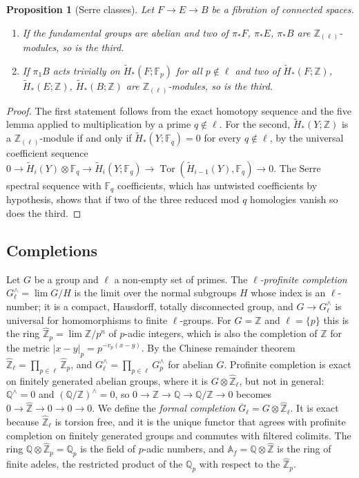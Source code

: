 \documentclass[11pt]{amsart}
\theoremstyle{plain}
\newtheorem{proposition}[theorem]{Proposition}
\theoremstyle{definition}
\numberwithin{equation}{section}
\newcommand{\Z}{\mathbb{Z}}
\newcommand{\Q}{\mathbb{Q}}
\newcommand{\F}{\mathbb{F}}
\newcommand{\Zhat}{\widehat{\mathbb{Z}}}
\newcommand{\Af}{\mathbb{A}_f}
\newcommand{\Zl}{\mathbb{Z}_{(\ell)}}
\DeclareMathOperator{\Tor}{Tor}
\begin{document}
\begin{proposition}[Serre classes]\label{prop:serre}
Let $F\to E\to B$ be a fibration of connected spaces.
\begin{enumerate}[label=\textup{(\arabic*)}]
\item If the fundamental groups are abelian and two of $\pi_*F$, $\pi_*E$, $\pi_*B$ are $\Zl$-modules, so is the third.
\item If $\pi_1B$ acts trivially on $\widetilde H_*(F;\F_p)$ for all $p\notin\ell$ and two of $\widetilde H_*(F;\Z)$, $\widetilde H_*(E;\Z)$, $\widetilde H_*(B;\Z)$ are $\Zl$-modules, so is the third.
\end{enumerate}
\end{proposition}

\begin{proof}
The first statement follows from the exact homotopy sequence and the five lemma applied to multiplication by a prime $q\notin\ell$.
For the second, $\widetilde H_*(Y;\Z)$ is a $\Zl$-module if and only if $\widetilde H_*(Y;\F_q)=0$ for every $q\notin\ell$, by the universal coefficient sequence $0\to\widetilde H_i(Y)\otimes\F_q\to\widetilde H_i(Y;\F_q)\to\Tor(\widetilde H_{i-1}(Y),\F_q)\to0$.
The Serre spectral sequence with $\F_q$ coefficients, which has untwisted coefficients by hypothesis, shows that if two of the three reduced mod $q$ homologies vanish so does the third.
\end{proof}

\subsection{Completions}
Let $G$ be a group and $\ell$ a non-empty set of primes.
The \emph{$\ell$-profinite completion} $G^\wedge_\ell=\lim G/H$ is the limit over the normal subgroups $H$ whose index is an $\ell$-number; it is a compact, Hausdorff, totally disconnected group, and $G\to G^\wedge_\ell$ is universal for homomorphisms to finite $\ell$-groups.
For $G=\Z$ and $\ell=\{p\}$ this is the ring $\Zhat_p=\lim\Z/p^n$ of $p$-adic integers, which is also the completion of $\Z$ for the metric $|x-y|_p=p^{-v_p(x-y)}$.
By the Chinese remainder theorem $\Zhat_\ell=\prod_{p\in\ell}\Zhat_p$, and $G^\wedge_\ell=\prod_{p\in\ell}G^\wedge_p$ for abelian $G$.
Profinite completion is exact on finitely generated abelian groups, where it is $G\otimes\Zhat_\ell$, but not in general: $\Q^\wedge=0$ and $(\Q/\Z)^\wedge=0$, so $0\to\Z\to\Q\to\Q/\Z\to0$ becomes $0\to\Zhat\to0\to0\to0$.
We define the \emph{formal completion} $\overline G_\ell=G\otimes\Zhat_\ell$.
It is exact because $\Zhat_\ell$ is torsion free, and it is the unique functor that agrees with profinite completion on finitely generated groups and commutes with filtered colimits.
The ring $\Q\otimes\Zhat_p=\Q_p$ is the field of $p$-adic numbers, and $\Af=\Q\otimes\Zhat$ is the ring of finite adeles, the restricted product of the $\Q_p$ with respect to the $\Zhat_p$.
\end{document}
